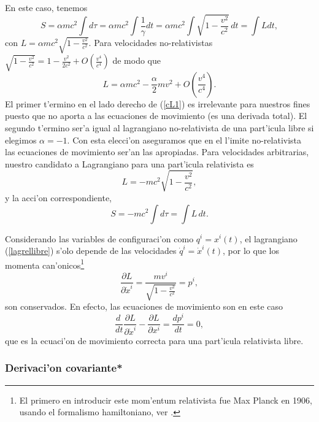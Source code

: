 En este caso, tenemos
\begin{equation}
S=\alpha mc^2\int  d\tau=\alpha mc^2\int \frac{1}{\gamma}dt=\alpha mc^2\int
\sqrt{1-\frac{v^2}{c^2}}\,dt=\int L dt, \label{lagrellibre0}
\end{equation}
con $L=\alpha mc^2 \sqrt{1-\frac{v^2}{c^2}}$.
Para velocidades no-relativistas $\sqrt{1-\frac{v^2}{c^2}}=1-\frac{v^2}{2c^2}+O(\frac{v^4}{c^4})$  de modo que
\begin{equation}
L=\alpha mc^2-\frac{\alpha}{2}mv^2+O(\frac{v^4}{c^4}). \label{cL1}
\end{equation}
El primer t'ermino en el lado derecho de (\ref{cL1}) es irrelevante para nuestros fines puesto que no aporta a las ecuaciones de movimiento (es una derivada total). El segundo t'ermino ser'a igual al lagrangiano no-relativista de una part'icula libre si elegimos $\alpha=-1$. Con esta elecci'on aseguramos que en el l'imite no-relativista las ecuaciones de movimiento ser'an las apropiadas. Para velocidades arbitrarias, nuestro candidato a Lagrangiano para una part'icula relativista es
\begin{equation}
L=-mc^2 \sqrt{1-\frac{v^2}{c^2}},\label{lagrellibre}
\end{equation}
y la acci'on correspondiente,
\begin{equation}
\boxed{S=- mc^2\int  d\tau=\int L\, dt.}
\end{equation}

Considerando las variables de configuraci'on como $q^i=x^i(t)$, el lagrangiano (\ref{lagrellibre}) s'olo depende de las velocidades $\dot{q}^i=\dot{x}^i(t)$, por lo que los momenta can'onicos\footnote{El primero en introducir este mom'entum relativista fue Max Planck en 1906, usando el formalismo hamiltoniano, ver \cite{Planck06}.}
\begin{equation}
\frac{\partial L}{\partial \dot{x}^i}=\frac{mv^i}{\sqrt{1-\frac{v^2}{c^2}}}=p^i,
\end{equation}
son conservados. En efecto, las ecuaciones de movimiento son en este caso
\begin{equation}
\frac{d\ }{dt}\frac{\partial L}{\partial \dot{x}^i}-\frac{\partial L}{\partial x^i}=\frac{d p^i}{dt} =0,
\end{equation}
que es la ecuaci'on de movimiento correcta para una part'icula relativista
libre.

\subsubsection{Derivaci'on covariante*}


